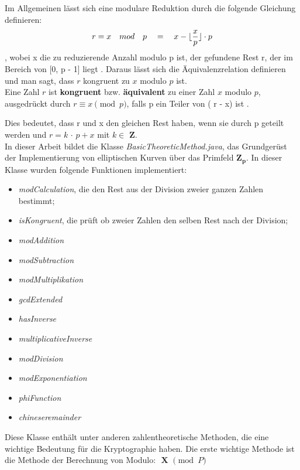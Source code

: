 Im Allgemeinen lässt sich eine modulare Reduktion durch die folgende Gleichung definieren: \[ r = x \quad mod \quad p \quad = \quad x - \lfloor\frac{x}{p}\rfloor \cdot p \], wobei x die zu reduzierende Anzahl modulo p ist, der gefundene Rest r, der im Bereich von [0, p - 1] liegt \cite{patent}. Daraus lässt sich die Äquivalenzrelation definieren und man sagt, dass $ r $ kongruent zu $ x $ modulo $ p $ ist.\\

Eine Zahl $ r $ ist \textbf{kongruent} bzw. \textbf{äquivalent} zu einer Zahl $ x $ modulo $ p $, ausgedrückt durch \( r \equiv x \pmod{p} \), falls p ein Teiler von ( r - x) ist \cite{damer}.


Dies bedeutet, dass r und x den gleichen Rest haben, wenn sie durch p geteilt werden und $ r = k $ $\cdot $ $ p + x $ mit  $ k \in $ $ \mathbf{Z} $.\\



In dieser Arbeit bildet  die Klasse \textit{BasicTheoreticMethod.java}, das Grundgerüst der Implementierung von elliptischen Kurven über das Primfeld $\mathbf{ Z_p} $. 
In dieser Klasse wurden folgende Funktionen implementiert:
\begin{itemize}
    \item \textit{modCalculation}, die den Rest aus der Division zweier ganzen Zahlen bestimmt; 
    \item \textit{isKongruent}, die prüft ob zweier Zahlen den selben Rest nach der Division;
    \item \textit{modAddition}
    \item \textit{modSubtraction}
    \item \textit{modMultiplikation}
    \item \textit{gcdExtended}
    \item \textit{hasInverse}
    \item \textit{multiplicativeInverse}
    \item \textit{modDivision}
    \item \textit{modExponentiation}
    \item \textit{phiFunction}
    \item \textit{chineseremainder}
\end{itemize}

Diese Klasse enthält unter anderen zahlentheoretische Methoden, die eine wichtige Bedeutung für die Kryptographie haben.
Die erste wichtige Methode ist die Methode der Berechnung von Modulo: $\textbf{ X $\pmod P $} $

